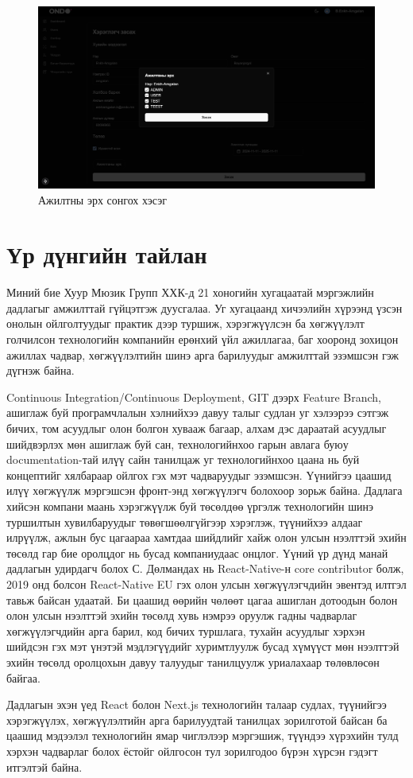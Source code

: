 \begin{figure}
	\centering
	\includegraphics[width=15cm]{images/role.png}
	\caption{Ажилтны эрх сонгох хэсэг}
\end{figure}



\pagebreak
\section{Үр дүнгийн тайлан}
Миний бие Хуур Мюзик Групп ХХК-д 21 хоногийн хугацаатай мэргэжлийн дадлагыг амжилттай гүйцэтгэж дуусгалаа. Уг хугацаанд хичээлийн хүрээнд үзсэн онолын ойлголтуудыг практик дээр туршиж, хэрэгжүүлсэн ба хөгжүүлэлт голчилсон технологийн компанийн ерөнхий үйл ажиллагаа, баг хооронд зохицон ажиллах чадвар, хөгжүүлэлтийн шинэ арга барилуудыг амжилттай эзэмшсэн гэж дүгнэж байна.

\quad Continuous Integration/Continuous Deployment, GIT дээрх Feature Branch, ашиглаж буй програмчлалын хэлнийхээ давуу талыг судлан уг хэлээрээ сэтгэж бичих, том асуудлыг олон болгон хувааж багаар, алхам дэс дараатай асуудлыг шийдвэрлэх мөн ашиглаж буй сан, технологийнхоо гарын авлага буюу documentation-тай илүү сайн танилцаж уг технологийнхоо цаана нь буй концептийг хялбараар ойлгох гэх мэт чадваруудыг эзэмшсэн. Үүнийгээ цаашид илүү хөгжүүлж мэргэшсэн фронт-энд хөгжүүлэгч болохоор зорьж байна. Дадлага хийсэн компани маань хэрэгжүүлж буй төсөлдөө үргэлж технологийн шинэ туршилтын хувилбаруудыг төвөгшөөлгүйгээр хэрэглэж, түүнийхээ алдааг илрүүлж, ажлын бус цагаараа хамтдаа шийдлийг хайж олон улсын нээлттэй эхийн төсөлд гар бие оролцдог нь бусад компаниудаас онцлог. Үүний үр дүнд манай дадлагын удирдагч болох С. Дөлмандах нь React-Native-н core contributor болж, 2019 онд болсон React-Native EU гэх олон улсын хөгжүүлэгчдийн эвентэд илтгэл тавьж байсан удаатай. Би цаашид өөрийн чөлөөт цагаа ашиглан дотоодын болон олон улсын нээлттэй эхийн төсөлд хувь нэмрээ оруулж гадны чадварлаг хөгжүүлэгчдийн арга барил, код бичих туршлага, тухайн асуудлыг хэрхэн шийдсэн гэх мэт үнэтэй мэдлэгүүдийг хуримтлуулж бусад хүмүүст мөн нээлттэй эхийн төсөлд оролцохын давуу талуудыг танилцуулж уриалахаар төлөвлөсөн байгаа.

\quad Дадлагын эхэн үед React болон Next.js технологийн талаар судлах, түүнийгээ хэрэгжүүлэх, хөгжүүлэлтийн арга барилуудтай танилцах зорилготой байсан ба цаашид мэдээлэл технологийн ямар чиглэлээр мэргэшиж, түүндээ хүрэхийн тулд хэрхэн чадварлаг болох ёстойг ойлгосон тул зорилгодоо бүрэн хүрсэн гэдэгт итгэлтэй байна. 